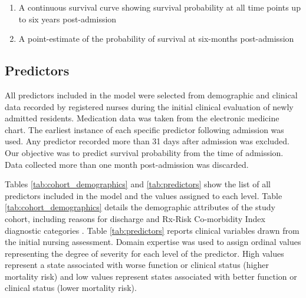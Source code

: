 \documentclass{article}
\begin{document}
\begin{enumerate}
    \item A continuous survival curve showing survival probability at all time points up to six years post-admission
    \item A point-estimate of the probability of survival at six-months post-admission

\end{enumerate}

\subsection{Predictors}
All predictors included in the model were selected from demographic and clinical data recorded by registered nurses during the initial clinical evaluation of newly admitted residents.  Medication data was taken from the electronic medicine chart.   The earliest instance of each specific predictor following admission was used.  Any predictor recorded more than 31 days after admission was excluded. Our objective was to predict survival probability from the time of admission.  Data collected more than one month post-admission was discarded.

Tables \ref{tab:cohort_demographics} and \ref{tab:predictors} show the list of all predictors included in the model and the values assigned to each level. Table \ref{tab:cohort_demographics} details the demographic attributes of the study cohort, including reasons for discharge and Rx-Risk Co-morbidity Index diagnostic categories \cite{pratt2018validity}. Table \ref{tab:predictors} reports clinical variables drawn from the initial nursing assessment. Domain expertise was used to assign ordinal values representing the degree of severity for each level of the predictor.   High values represent a state associated with worse function or clinical status (higher mortality risk) and low values represent states associated with better function or clinical status (lower mortality risk).
\end{document}
